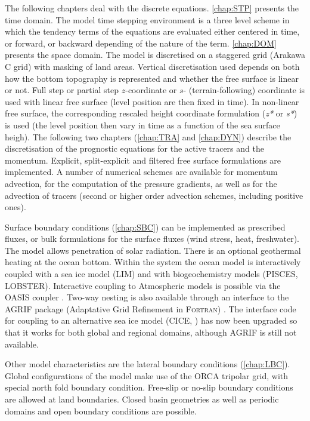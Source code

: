 \documentclass[../tex_main/NEMO_manual]{subfiles}
\begin{document}
The following chapters deal with the discrete equations.
\autoref{chap:STP} presents the time domain.
The model time stepping environment is a three level scheme in which the tendency terms of
the equations are evaluated either centered in time, or forward, or backward depending of the nature of the term.
\autoref{chap:DOM} presents the space domain.
The model is discretised on a staggered grid (Arakawa C grid) with masking of land areas.
Vertical discretisation used depends on both how the bottom topography is represented and
whether the free surface is linear or not.
Full step or partial step $z$-coordinate or $s$- (terrain-following) coordinate is used with
linear free surface (level position are then fixed in time).
In non-linear free surface,
the corresponding rescaled height coordinate formulation (\textit{z*} or \textit{s*}) is used
(the level position then vary in time as a function of the sea surface heigh).
The following two chapters (\autoref{chap:TRA} and \autoref{chap:DYN}) describe the discretisation of
the prognostic equations for the active tracers and the momentum.
Explicit, split-explicit and filtered free surface formulations are implemented.
A number of numerical schemes are available for momentum advection, for the computation of the pressure gradients,
as well as for the advection of tracers (second or higher order advection schemes, including positive ones).

Surface boundary conditions (\autoref{chap:SBC}) can be implemented as prescribed fluxes,
or bulk formulations for the surface fluxes (wind stress, heat, freshwater).
The model allows penetration of solar radiation.
There is an optional geothermal heating at the ocean bottom.
Within the \NEMO system the ocean model is interactively coupled with a sea ice model (LIM) and
with biogeochemistry models (PISCES, LOBSTER).
Interactive coupling to Atmospheric models is possible via the OASIS coupler \citep{OASIS2006}.
Two-way nesting is also available through an interface to the AGRIF package
(Adaptative Grid Refinement in \textsc{Fortran}) \citep{Debreu_al_CG2008}.
The interface code for coupling to an alternative sea ice model (CICE, \citet{Hunke2008}) has now been upgraded so
that it works for both global and regional domains, although AGRIF is still not available.

Other model characteristics are the lateral boundary conditions (\autoref{chap:LBC}).
Global configurations of the model make use of the ORCA tripolar grid, with special north fold boundary condition.
Free-slip or no-slip boundary conditions are allowed at land boundaries.
Closed basin geometries as well as periodic domains and open boundary conditions are possible. 
\end{document}
